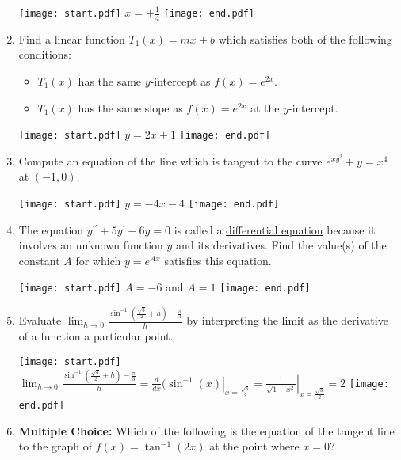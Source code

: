 \documentclass[12pt]{article}
\begin{document}
\begin{enumerate}
\texttt{[image: start.pdf]}
{{$x=\pm\frac{1}{4}$}}
\texttt{[image: end.pdf]}


\item Find a linear function $T_1(x)=mx+b$ which satisfies both of the following conditions:

\begin{itemize}

\item $T_1(x)$ has the same $y$-intercept as $f(x)=e^{2x}$.

\item $T_1(x)$ has the same slope as $f(x)=e^{2x}$ at the $y$-intercept.

\end{itemize}

\texttt{[image: start.pdf]}
{{$y=2x+1$}}
\texttt{[image: end.pdf]}


\item Compute an equation of the line which is tangent to the curve $e^{xy^2}+y=x^4$ at $(-1,0)$.

\texttt{[image: start.pdf]}
{{$y=-4x-4$}}
\texttt{[image: end.pdf]}


\item The equation $y^{\prime \prime}+5y^{\prime}-6y=0$ is called a \underline{differential equation} because it involves an unknown function $y$ and its derivatives.  Find the value(s) of the constant $A$ for which $y=e^{Ax}$ satisfies this equation. 

\texttt{[image: start.pdf]}
{{$A=-6$ and $A=1$}}
\texttt{[image: end.pdf]}


\item Evaluate $\lim_{h \rightarrow 0}{\frac{\sin^{-1}{\left(\frac{\sqrt{3}}{2}+h\right)}-\frac{\pi}{3}}{h}}$ by interpreting the limit as the derivative of a function a particular point.

\texttt{[image: start.pdf]}
{{$\lim_{h \rightarrow 0}{\frac{\sin^{-1}{\left(\frac{\sqrt{3}}{2}+h\right)}-\frac{\pi}{3}}{h}}=\left.\frac{d}{dx}(\sin^{-1}{(x)}\right|_{x=\frac{\sqrt{3}}{2}}=\left.\frac{1}{\sqrt{1-x^2}}\right|_{x=\frac{\sqrt{3}}{2}}=2$}}
\texttt{[image: end.pdf]}


\item {\bf Multiple Choice:} Which of the following is the equation of the tangent line to the graph of $f(x)=\tan^{-1}(2x)$ at the point where $x=0$?

\begin{enumerate}


\end{enumerate}
\end{enumerate}
\end{document}

